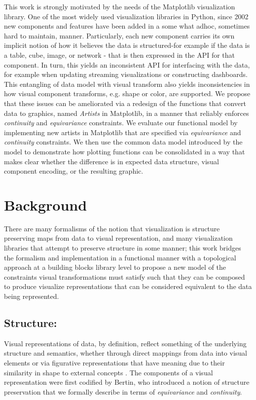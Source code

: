 \documentclass[../main.tex]{subfiles}
\begin{document}
This work is strongly motivated by the needs of the Matplotlib\cite{hunterMatplotlib2DGraphics2007,hunterArchitectureOpenSource} visualization library. One of the most widely used visualization libraries in Python, since 2002 new components and features have been added in a some what adhoc, sometimes hard to maintain, manner. Particularly, each new component carries its own implicit notion of how it believes the data is structured-for example if the data is a table, cube, image, or network - that is then expressed in the API for that component. In turn, this yields an inconsistent API for interfacing with the data, for example when  updating streaming visualizations or constructing dashboards\cite{a.sarikayaWhatWeTalk2019}. This entangling of data model with visual transform also yields inconsistencies in how visual component transforms, e.g. shape or color, are supported. We propose that these issues can be ameliorated via a redesign of the functions that convert data to graphics, named \textit{Artists} in Matplotlib, in a manner that reliably enforces \textit{continuity} and \textit{equivariance} constraints. We evaluate our functional model by implementing new artists in Matplotlib that are specified via \textit{equivariance} and \textit{continuity} constraints. We then use the common data model introduced by the model to demonstrate how plotting functions can be consolidated in a way that makes clear whether the difference is in expected data structure, visual component encoding, or the resulting graphic. 

\section{Background}
There are many formalisms of the notion that visualization is structure preserving maps from data to visual representation, and many visualization libraries that attempt to preserve structure in some manner; this work bridges the formalism and implementation in a functional manner with a topological approach at a building blocks library level to propose a new model of the constraints visual transformations must satisfy such that they can be composed to produce visualize representations that can be considered equivalent to the data being represented.

\subsection{Structure:}
\label{sec:intro:structure}
Visual representations of data, by definition, reflect something of the underlying structure and semantics\cite{friendlyBriefHistoryData2008}, whether through direct mappings from data into visual elements or via figurative representations that have meaning due to their similarity in shape to external concepts \cite{byrneAcquiredCodesMeaning2016}. The components of a visual representation were first codified by Bertin\cite{bertinSemiologyGraphicsDiagrams2011a}, who introduced a notion of structure preservation that we formally describe in terms of \textit{equivariance} and \textit{continuity}. 
 
\end{document}
